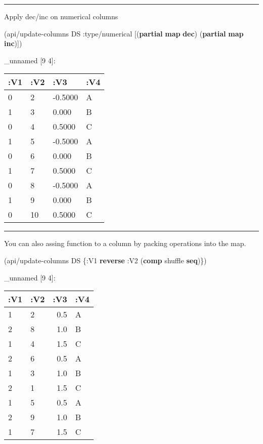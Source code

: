 \documentclass[]{article}
\newenvironment{Shaded}{\begin{snugshade}}{\end{snugshade}}
\newcommand{\KeywordTok}[1]{\textcolor[rgb]{0.13,0.29,0.53}{\textbf{#1}}}
\newcommand{\AttributeTok}[1]{\textcolor[rgb]{0.77,0.63,0.00}{#1}}
\newcommand{\NormalTok}[1]{#1}
\begin{document}
\begin{center}\rule{0.5\linewidth}{0.5pt}\end{center}

Apply dec/inc on numerical columns

\begin{Shaded}
\begin{Highlighting}[]
\NormalTok{(api/update-columns DS }\AttributeTok{:type/numerical}\NormalTok{ [(}\KeywordTok{partial} \KeywordTok{map} \KeywordTok{dec}\NormalTok{)}
\NormalTok{                                        (}\KeywordTok{partial} \KeywordTok{map} \KeywordTok{inc}\NormalTok{)])}
\end{Highlighting}
\end{Shaded}

\_unnamed {[}9 4{]}:

\begin{longtable}[]{@{}llll@{}}
\toprule
:V1 & :V2 & :V3 & :V4\tabularnewline
\midrule
\endhead
0 & 2 & -0.5000 & A\tabularnewline
1 & 3 & 0.000 & B\tabularnewline
0 & 4 & 0.5000 & C\tabularnewline
1 & 5 & -0.5000 & A\tabularnewline
0 & 6 & 0.000 & B\tabularnewline
1 & 7 & 0.5000 & C\tabularnewline
0 & 8 & -0.5000 & A\tabularnewline
1 & 9 & 0.000 & B\tabularnewline
0 & 10 & 0.5000 & C\tabularnewline
\bottomrule
\end{longtable}

\begin{center}\rule{0.5\linewidth}{0.5pt}\end{center}

You can also assing function to a column by packing operations into the
map.

\begin{Shaded}
\begin{Highlighting}[]
\NormalTok{(api/update-columns DS \{}\AttributeTok{:V1} \KeywordTok{reverse}
                        \AttributeTok{:V2}\NormalTok{ (}\KeywordTok{comp}\NormalTok{ shuffle }\KeywordTok{seq}\NormalTok{)\})}
\end{Highlighting}
\end{Shaded}

\_unnamed {[}9 4{]}:

\begin{longtable}[]{@{}llrl@{}}
\toprule
:V1 & :V2 & :V3 & :V4\tabularnewline
\midrule
\endhead
1 & 2 & 0.5 & A\tabularnewline
2 & 8 & 1.0 & B\tabularnewline
1 & 4 & 1.5 & C\tabularnewline
2 & 6 & 0.5 & A\tabularnewline
1 & 3 & 1.0 & B\tabularnewline
2 & 1 & 1.5 & C\tabularnewline
1 & 5 & 0.5 & A\tabularnewline
2 & 9 & 1.0 & B\tabularnewline
1 & 7 & 1.5 & C\tabularnewline
\bottomrule
\end{longtable}
\end{document}
